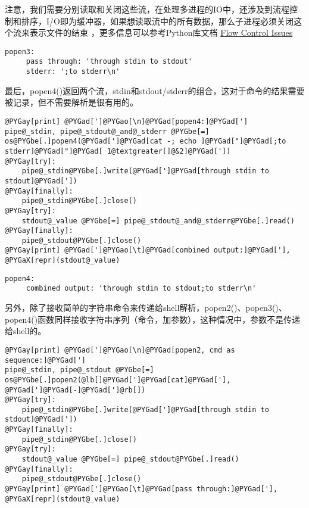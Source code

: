 \documentclass[a4paper,10pt,english]{manual}
\begin{document}
注意，我们需要分别读取和关闭这些流，在处理多进程的IO中，还涉及到流程控制和排序，I/O即为缓冲器，如果想读取流中的所有数据，那么子进程必须关闭这个流来表示文件的结束 ，更多信息可以参考Python库文档 \href{http://docs.python.org/lib/popen2-flow-control.html}{Flow Control Issues}

\begin{Verbatim}[commandchars=@\[\]]
popen3:
     pass through: 'through stdin to stdout'
     stderr: ';to stderr\n'
\end{Verbatim}

最后，popen4()返回两个流，stdin和stdout/stderr的组合，这对于命令的结果需要被记录，但不需要解析是很有用的。

\begin{Verbatim}[commandchars=@\[\]]
@PYGay[print] @PYGad[']@PYGao[\n]@PYGad[popen4:]@PYGad[']
pipe@_stdin, pipe@_stdout@_and@_stderr @PYGbe[=] os@PYGbe[.]popen4(@PYGad[']@PYGad[cat -; echo ]@PYGad["]@PYGad[;to stderr]@PYGad["]@PYGad[ 1@textgreater[]@&2]@PYGad['])
@PYGay[try]:
    pipe@_stdin@PYGbe[.]write(@PYGad[']@PYGad[through stdin to stdout]@PYGad['])
@PYGay[finally]:
    pipe@_stdin@PYGbe[.]close()
@PYGay[try]:
    stdout@_value @PYGbe[=] pipe@_stdout@_and@_stderr@PYGbe[.]read()
@PYGay[finally]:
    pipe@_stdout@PYGbe[.]close()
@PYGay[print] @PYGad[']@PYGao[\t]@PYGad[combined output:]@PYGad['], @PYGaX[repr](stdout@_value)
\end{Verbatim}

\begin{Verbatim}[commandchars=@\[\]]
popen4:
     combined output: 'through stdin to stdout;to stderr\n'
\end{Verbatim}

另外，除了接收简单的字符串命令来传递给shell解析，popen2()、popen3()、popen4()函数同样接收字符串序列（命令，加参数），这种情况中，参数不是传递给shell的。

\begin{Verbatim}[commandchars=@\[\]]
@PYGay[print] @PYGad[']@PYGao[\n]@PYGad[popen2, cmd as sequence:]@PYGad[']
pipe@_stdin, pipe@_stdout @PYGbe[=] os@PYGbe[.]popen2(@lb[]@PYGad[']@PYGad[cat]@PYGad['], @PYGad[']@PYGad[-]@PYGad[']@rb[])
@PYGay[try]:
    pipe@_stdin@PYGbe[.]write(@PYGad[']@PYGad[through stdin to stdout]@PYGad['])
@PYGay[finally]:
    pipe@_stdin@PYGbe[.]close()
@PYGay[try]:
    stdout@_value @PYGbe[=] pipe@_stdout@PYGbe[.]read()
@PYGay[finally]:
    pipe@_stdout@PYGbe[.]close()
@PYGay[print] @PYGad[']@PYGao[\t]@PYGad[pass through:]@PYGad['], @PYGaX[repr](stdout@_value)
\end{Verbatim}
\end{document}
